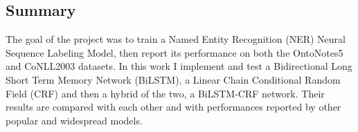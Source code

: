 \documentclass[journal]{IEEEtran}
\begin{document}







\maketitle









%
\IEEEpeerreviewmaketitle







\begin{center}
\section*{Summary} %
\end{center}
The goal of the project was to train a Named Entity Recognition (NER) Neural Sequence Labeling Model, then report its performance on both the OntoNotes5 and CoNLL2003 datasets. In this work I implement and test a Bidirectional Long Short Term Memory Network (BiLSTM), a Linear Chain Conditional Random Field (CRF) and then a hybrid of the two, a BiLSTM-CRF network. Their results are compared with each other and with performances reported by other popular and widespread models.
\end{document}
